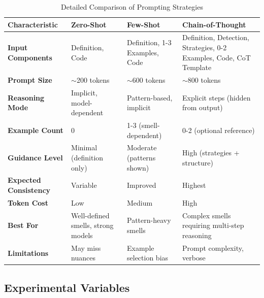 \begin{table}[h]
\centering
\caption{Detailed Comparison of Prompting Strategies}
\label{tab:strategy-comparison-detailed}
\small
\begin{tabular}{@{}p{3cm}p{3.5cm}p{3.5cm}p{3.5cm}@{}}
\toprule
\textbf{Characteristic} & \textbf{Zero-Shot} & \textbf{Few-Shot} & \textbf{Chain-of-Thought} \\ \midrule
\textbf{Input Components} & 
  Definition, Code & 
  Definition, 1-3 Examples, Code & 
  Definition, Detection, Strategies, 0-2 Examples, Code, CoT Template \\
\addlinespace
\textbf{Prompt Size} & 
  $\sim$200 tokens & 
  $\sim$600 tokens & 
  $\sim$800 tokens \\
\addlinespace
\textbf{Reasoning Mode} & 
  Implicit, model-dependent & 
  Pattern-based, implicit & 
  Explicit steps (hidden from output) \\
\addlinespace
\textbf{Example Count} & 
  0 & 
  1-3 (smell-dependent) & 
  0-2 (optional reference) \\
\addlinespace
\textbf{Guidance Level} & 
  Minimal (definition only) & 
  Moderate (patterns shown) & 
  High (strategies + structure) \\
\addlinespace
\textbf{Expected Consistency} & 
  Variable & 
  Improved & 
  Highest \\
\addlinespace
\textbf{Token Cost} & 
  Low & 
  Medium & 
  High \\
\addlinespace
\textbf{Best For} & 
  Well-defined smells, strong models & 
  Pattern-heavy smells & 
  Complex smells requiring multi-step reasoning \\
\addlinespace
\textbf{Limitations} & 
  May miss nuances & 
  Example selection bias & 
  Prompt complexity, verbose \\ \bottomrule
\end{tabular}
\end{table}

\subsection{Experimental Variables}

